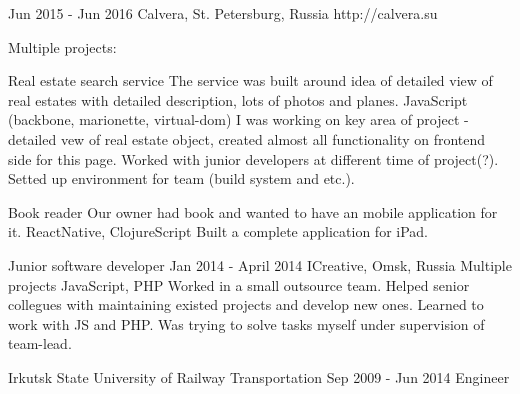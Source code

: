 \documentclass[11pt,a4paper,sans]{awesomecv}
\begin{document}
\begin{cventries}
    {Jun 2015 - Jun 2016}
    {Calvera, St. Petersburg, Russia}
    {http://calvera.su}
    {
      Multiple projects:\newline
      \begin{cvprojects}{0.8ex}
        \item \cvproject
            {Real estate search service}
            {}
            {The service was built around idea of detailed view of real estates with detailed description, lots of photos and planes.}
            {JavaScript (backbone, marionette, virtual-dom)}
            {
              I was working on key area of project - detailed vew of real estate object,
              created almost all functionality on frontend side for this page.
              Worked with junior developers at different time of project(?).
              Setted up environment for team (build system and etc.).
            }
        \item \cvproject
            {Book reader}
            {}
            {Our owner had book and wanted to have an mobile application for it.}
            {ReactNative, ClojureScript}
            {Built a complete application for iPad.}
      \end{cvprojects}
    }
\cventry
    {Junior software developer}
    {Jan 2014 - April 2014}
    {ICreative, Omsk, Russia}{}
    {
      Multiple projects\newline
      \vspace{0.8ex}
      \cvproject
          {}{}{}
          {JavaScript, PHP}
          {
            Worked in a small outsource team.
            Helped senior collegues with maintaining existed projects and develop new ones.
            Learned to work with JS and PHP. Was trying to solve tasks myself under supervision of team-lead.
          }
    }
\end{cventries}

\begin{cventries}
\cventry
    {Irkutsk State University of Railway Transportation}
    {Sep 2009 - Jun 2014}
    {Engineer}
    {}
    {}
\end{cventries}
\end{document}
